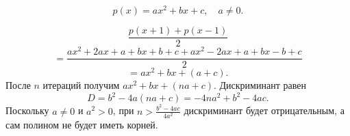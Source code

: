 \documentclass[a4paper, 12pt]{article}
\begin{document}
\[
p(x) = ax^2 + bx + c, \quad a \ne 0.
\]

\[
\frac {p(x+1) + p(x-1)}2 \]
\[ = \frac {a x^2 + 2 ax + a + bx + b + c + a x^2 - 2ax + a + bx - b + c}{2} \]
\[= a x^2 + bx + (a + c).
\]
После $n$ итераций получим $a x^2 + bx + (na + c)$. Дискриминант равен
\[
D = b^2 - 4 a (na +c) = -4na^2 + b^2 - 4 ac.\]
Поскольку $a\ne0$ и $a^2>0$, при $n > \frac{b^2 - 4 ac}{4a^2}$ дискриминант будет отрицательным, а сам полином не будет иметь корней.
\end{document}
